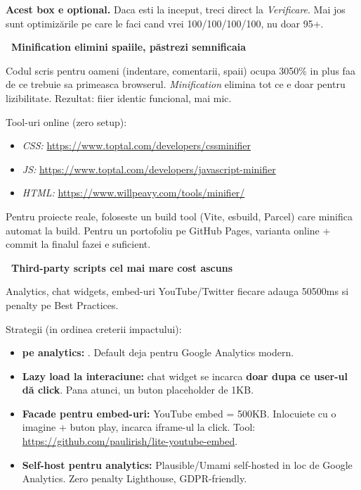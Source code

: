 \begin{bonusbox}
\textbf{Acest box e optional.} Daca esti la inceput, treci direct la \emph{Verificare}. Mai jos sunt optimiz\u arile pe care le faci cand vrei 100/100/100/100, nu doar 95+.

\medskip

\textbf{\faCompress\ Minification \textendash{} elimini spaiile, p\u astrezi semnificaia}

Codul scris pentru oameni (indentare, comentarii, spaii) ocupa 30\textendash{}50\% in plus faa de ce trebuie sa primeasca browserul. \emph{Minification} elimina tot ce e doar pentru lizibilitate. Rezultat: fiier identic funcional, mai mic.

Tool-uri online (zero setup):
\begin{itemize}[itemsep=1pt]
  \item \emph{CSS:} \url{https://www.toptal.com/developers/cssminifier}
  \item \emph{JS:} \url{https://www.toptal.com/developers/javascript-minifier}
  \item \emph{HTML:} \url{https://www.willpeavy.com/tools/minifier/}
\end{itemize}

Pentru proiecte reale, foloseste un build tool (Vite, esbuild, Parcel) care minifica automat la build. Pentru un portofoliu pe GitHub Pages, varianta online + commit la finalul fazei e suficient.

\medskip

\textbf{\faBullhorn\ Third-party scripts \textendash{} cel mai mare cost ascuns}

Analytics, chat widgets, embed-uri YouTube/Twitter \textendash{} fiecare adauga 50\textendash{}500ms si penalty pe Best Practices.

Strategii (in ordinea creterii impactului):

\begin{itemize}[itemsep=2pt]
  \item \textbf{ pe analytics:} . Default deja pentru Google Analytics modern.
  \item \textbf{Lazy load la interaciune:} chat widget se incarca \textbf{doar dupa ce user-ul d\u a click}. Pana atunci, un buton placeholder de 1KB.
  \item \textbf{Facade pentru embed-uri:} YouTube embed = 500KB. Inlocuiete cu o imagine + buton play, incarca iframe-ul la click. Tool: \url{https://github.com/paulirish/lite-youtube-embed}.
  \item \textbf{Self-host pentru analytics:} Plausible/Umami self-hosted in loc de Google Analytics. Zero penalty Lighthouse, GDPR-friendly.
\end{itemize}


\end{bonusbox}
